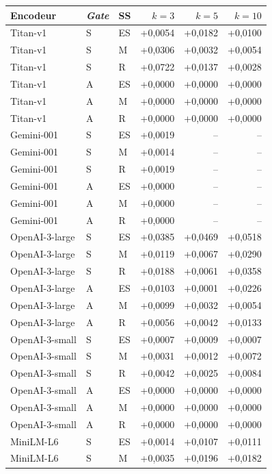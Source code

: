 \documentclass[a4paper,10pt]{article}
\begin{document}
\begin{table}[p]
\centering
\small
\begin{tabular}{lllrrr}
\toprule
Encodeur & \textit{Gate} & SS & $k=3$ & $k=5$ & $k=10$ \\
\midrule
Titan-v1 & S & ES & +0,0054 & +0,0182 & +0,0100 \\
Titan-v1 & S & M & +0,0306 & +0,0032 & +0,0054 \\
Titan-v1 & S & R & +0,0722 & +0,0137 & +0,0028 \\
Titan-v1 & A & ES & +0,0000 & +0,0000 & +0,0000 \\
Titan-v1 & A & M & +0,0000 & +0,0000 & +0,0000 \\
Titan-v1 & A & R & +0,0000 & +0,0000 & +0,0000 \\
\midrule
Gemini-001 & S & ES & +0,0019 & -- & -- \\
Gemini-001 & S & M & +0,0014 & -- & -- \\
Gemini-001 & S & R & +0,0019 & -- & -- \\
Gemini-001 & A & ES & +0,0000 & -- & -- \\
Gemini-001 & A & M & +0,0000 & -- & -- \\
Gemini-001 & A & R & +0,0000 & -- & -- \\
\midrule
OpenAI-3-large & S & ES & +0,0385 & +0,0469 & +0,0518 \\
OpenAI-3-large & S & M & +0,0119 & +0,0067 & +0,0290 \\
OpenAI-3-large & S & R & +0,0188 & +0,0061 & +0,0358 \\
OpenAI-3-large & A & ES & +0,0103 & +0,0001 & +0,0226 \\
OpenAI-3-large & A & M & +0,0099 & +0,0032 & +0,0054 \\
OpenAI-3-large & A & R & +0,0056 & +0,0042 & +0,0133 \\
\midrule
OpenAI-3-small & S & ES & +0,0007 & +0,0009 & +0,0007 \\
OpenAI-3-small & S & M & +0,0031 & +0,0012 & +0,0072 \\
OpenAI-3-small & S & R & +0,0042 & +0,0025 & +0,0084 \\
OpenAI-3-small & A & ES & +0,0000 & +0,0000 & +0,0000 \\
OpenAI-3-small & A & M & +0,0000 & +0,0000 & +0,0000 \\
OpenAI-3-small & A & R & +0,0000 & +0,0000 & +0,0000 \\
\midrule
MiniLM-L6 & S & ES & +0,0014 & +0,0107 & +0,0111 \\
MiniLM-L6 & S & M & +0,0035 & +0,0196 & +0,0182 \\

\end{tabular}
\end{table}
\end{document}
